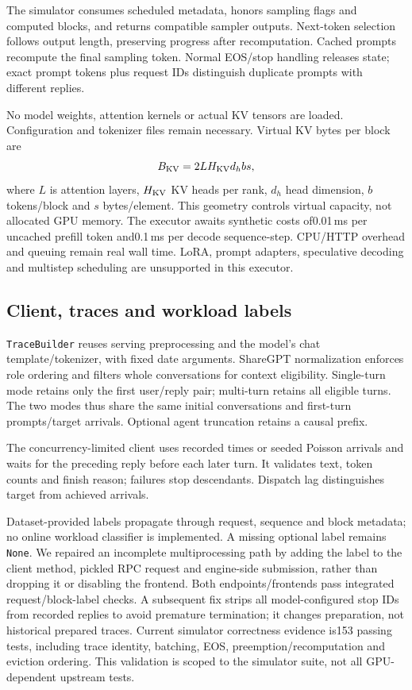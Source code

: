 \documentclass{article}
\begin{document}
The simulator consumes scheduled metadata, honors sampling flags and computed blocks, and returns compatible sampler outputs. Next-token selection follows output length, preserving progress after recomputation. Cached prompts recompute the final sampling token. Normal EOS/stop handling releases state; exact prompt tokens plus request IDs distinguish duplicate prompts with different replies.

No model weights, attention kernels or actual KV tensors are loaded. Configuration and tokenizer files remain necessary. Virtual KV bytes per block are
\begin{equation}
B_{\rm KV}=2 L H_{\rm KV}d_h b s,
\end{equation}
where $L$ is attention layers, $H_{\rm KV}$ KV heads per rank, $d_h$ head dimension, $b$ tokens/block and $s$ bytes/element. This geometry controls virtual capacity, not allocated GPU memory. The executor awaits synthetic costs of0.01\,ms per uncached prefill token and0.1\,ms per decode sequence-step. CPU/HTTP overhead and queuing remain real wall time. LoRA, prompt adapters, speculative decoding and multistep scheduling are unsupported in this executor.

\subsection{Client, traces and workload labels}
\texttt{TraceBuilder} reuses serving preprocessing and the model's chat template/tokenizer, with fixed date arguments. ShareGPT normalization enforces role ordering and filters whole conversations for context eligibility. Single-turn mode retains only the first user/reply pair; multi-turn retains all eligible turns. The two modes thus share the same initial conversations and first-turn prompts/target arrivals. Optional agent truncation retains a causal prefix.

The concurrency-limited client uses recorded times or seeded Poisson arrivals and waits for the preceding reply before each later turn. It validates text, token counts and finish reason; failures stop descendants. Dispatch lag distinguishes target from achieved arrivals.

Dataset-provided labels propagate through request, sequence and block metadata; no online workload classifier is implemented. A missing optional label remains \texttt{None}. We repaired an incomplete multiprocessing path by adding the label to the client method, pickled RPC request and engine-side submission, rather than dropping it or disabling the frontend. Both endpoints/frontends pass integrated request/block-label checks. A subsequent fix strips all model-configured stop IDs from recorded replies to avoid premature termination; it changes preparation, not historical prepared traces. Current simulator correctness evidence is153 passing tests, including trace identity, batching, EOS, preemption/recomputation and eviction ordering. This validation is scoped to the simulator suite, not all GPU-dependent upstream tests.
\end{document}
